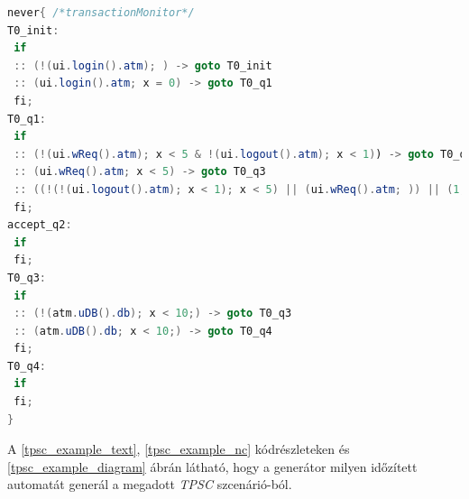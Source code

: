 \begin{lstlisting}[language=java,frame=single, float=h!, caption={Generált időzített automata never claim formátumban.},captionpos=b,label=tpsc_example_nc]
never{ /*transactionMonitor*/
T0_init:
 if
 :: (!(ui.login().atm); ) -> goto T0_init
 :: (ui.login().atm; x = 0) -> goto T0_q1
 fi;
T0_q1:
 if
 :: (!(ui.wReq().atm); x < 5 & !(ui.logout().atm); x < 1)) -> goto T0_q1
 :: (ui.wReq().atm; x < 5) -> goto T0_q3
 :: ((!(!(ui.logout().atm); x < 1); x < 5) || (ui.wReq().atm; )) || (1, x >= 5))) -> goto accept_q2
 fi;
accept_q2:
 if
 fi;
T0_q3:
 if
 :: (!(atm.uDB().db); x < 10;) -> goto T0_q3
 :: (atm.uDB().db; x < 10;) -> goto T0_q4
 fi;
T0_q4:
 if
 fi;
}
\end{lstlisting}

A \ref{tpsc_example_text}, \ref{tpsc_example_nc} kódrészleteken és \ref{tpsc_example_diagram} ábrán látható, hogy a generátor milyen időzített automatát generál a megadott \textit{TPSC} szcenárió-ból.